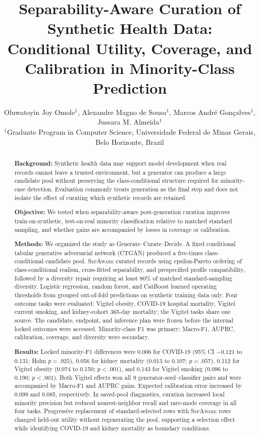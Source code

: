 \documentclass[11pt]{article}
\title{Separability-Aware Curation of Synthetic Health Data:\\Conditional Utility, Coverage, and Calibration in Minority-Class Prediction}
\author{
Oluwatoyin Joy Omole$^{1}$,
Alexandre Magno de Sousa$^{1}$,
Marcos André Gonçalves$^{1}$,
Jussara M. Almeida$^{1}$\\
\small $^{1}$Graduate Program in Computer Science, Universidade Federal de Minas Gerais, Belo Horizonte, Brazil
}
\date{}
\newcommand{\sepa}{\textsc{SepAware}}
\begin{document}
\maketitle

\begin{abstract}
\textbf{Background:} Synthetic health data may support model development when real records cannot leave a trusted environment, but a generator can produce a large candidate pool without preserving the class-conditional structure required for minority-case detection. Evaluation commonly treats generation as the final step and does not isolate the effect of curating which synthetic records are retained.

\textbf{Objective:} We tested when separability-aware post-generation curation improves train-on-synthetic, test-on-real minority classification relative to matched standard sampling, and whether gains are accompanied by losses in coverage or calibration.

\textbf{Methods:} We organized the study as Generate--Curate--Decide. A fixed conditional tabular generative adversarial network (CTGAN) produced a five-times class-conditional candidate pool. \sepa{} curated records using epsilon-Pareto ordering of class-conditional realism, cross-fitted separability, and prespecified profile compatibility, followed by a diversity repair requiring at least 80\% of matched standard-sampling diversity. Logistic regression, random forest, and CatBoost learned operating thresholds from grouped out-of-fold predictions on synthetic training data only. Four outcome tasks were evaluated: Vigitel obesity, COVID-19 hospital mortality, Vigitel current smoking, and kidney-cohort 365-day mortality; the Vigitel tasks share one source. The candidate, endpoint, and inference plan were frozen before the internal locked outcomes were accessed. Minority-class F1 was primary; Macro-F1, AUPRC, calibration, coverage, and diversity were secondary.

\textbf{Results:} Locked minority-F1 differences were 0.006 for COVID-19 (95\% CI $-0.121$ to 0.131; Holm $p=.925$), 0.056 for kidney mortality (0.013 to 0.107; $p=.057$), 0.112 for Vigitel obesity (0.074 to 0.150; $p<.001$), and 0.143 for Vigitel smoking (0.096 to 0.190; $p<.001$). Both Vigitel effects won all 9 generator-seed--classifier pairs and were accompanied by Macro-F1 and AUPRC gains. Expected calibration error increased by 0.099 and 0.085, respectively. In saved-pool diagnostics, curation increased local minority precision but reduced nearest-neighbor recall and rare-mode coverage in all four tasks. Progressive replacement of standard-selected rows with \sepa{} rows changed held-out utility without regenerating the pool, supporting a selection effect while identifying COVID-19 and kidney mortality as boundary conditions.


\end{abstract}
\end{document}
